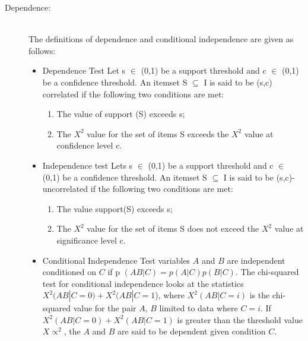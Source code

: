 \documentclass[sts]{sig-alternate}
\begin{document}
\begin{description}
			\item[Dependence:] \hfill \\		
				The definitions of dependence and conditional independence are given as follows:
				
				\begin{itemize}
  					\item Dependence Test\newline 
  						Let s $\in$ (0,1) be a support threshold and c $\in$ (0,1) be a confidence 								threshold. An itemset S $\subseteq$ I is said to be (s,c) correlated if the 								following two conditions are met:
  						
  						\begin{enumerate}
 							\item The value of support (S) exceeds s;
  							\item The $X^2$ value for the set of items S exceeds the $X^2$  value at 									confidence level c.
  							
						\end{enumerate}

  					\item Independence test\newline
						Lets s $\in$ (0,1) be a support threshold and c $\in$ (0,1) be a confidence 								threshold. An itemset S $\subseteq$  I is said to be (s,c)-uncorrelated if 								the following two conditions are met:

  						\begin{enumerate}
 							\item The value support(S) exceeds s;
  							\item The $X^2$ value for the set of items S does not exceed the $X^2$ 									value at significance level c.
						\end{enumerate}
  					
  					\item Conditional Independence Test\newline
						variables $A$ and $B$ are independent conditioned on $C$ if p $(AB|C) = p(A|C) 							p(B|	C)$. The chi-squared test for conditional independence looks at the 									statistics $X^2(AB|C=0) + X^2(AB|C=1$), where $X^2(AB|C=i)$ is the chi-squared 							value for the pair $A$, $B$ limited to data where $C=i$. If $X^2(AB|C=0) + 								X^2(AB|C=1)$ is greater than the threshold value $X\propto^2$, the $A$ and $B$ 							are 	said to be dependent given condition $C$.
						
				\end{itemize}
		\end{description}
\end{document}
